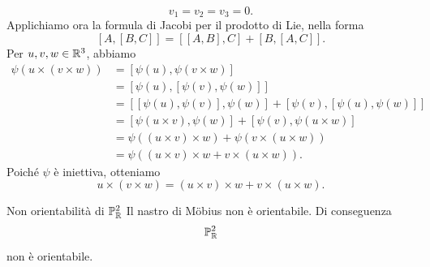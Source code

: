\documentclass[a4paper]{article}
\begin{document}
\begin{snippetproof}{}
    \[
        v_1=v_2=v_3=0.
    \]
    Applichiamo ora la formula di Jacobi per il prodotto di Lie, nella forma
    \[
        [A,[B,C]]
        =
        [[A,B],C]+[B,[A,C]].
    \]
    Per \(u,v,w\in\mathbb{R}^3\), abbiamo
    \begin{align*}
        \psi(u\times(v\times w))
        &=
        [\psi(u),\psi(v\times w)]\\
        &=
        [\psi(u),[\psi(v),\psi(w)]]\\
        &=
        [[\psi(u),\psi(v)],\psi(w)]
        +
        [\psi(v),[\psi(u),\psi(w)]]\\
        &=
        [\psi(u\times v),\psi(w)]
        +
        [\psi(v),\psi(u\times w)]\\
        &=
        \psi((u\times v)\times w)
        +
        \psi(v\times(u\times w))\\
        &=
        \psi((u\times v)\times w+v\times(u\times w)).
    \end{align*}
    Poiché \(\psi\) è iniettiva, otteniamo
    \[
        u\times(v\times w)
        =
        (u\times v)\times w+v\times(u\times w).
    \]
\end{snippetproof}



\begin{snippetproposition}{Non orientabilità di \(\mathbb{P}^2_{\mathbb{R}}\)}
    Il nastro di Möbius non è orientabile. Di conseguenza
    \[
        \mathbb{P}^2_{\mathbb{R}}
    \]
    non è orientabile.
\end{snippetproposition}
\end{document}
